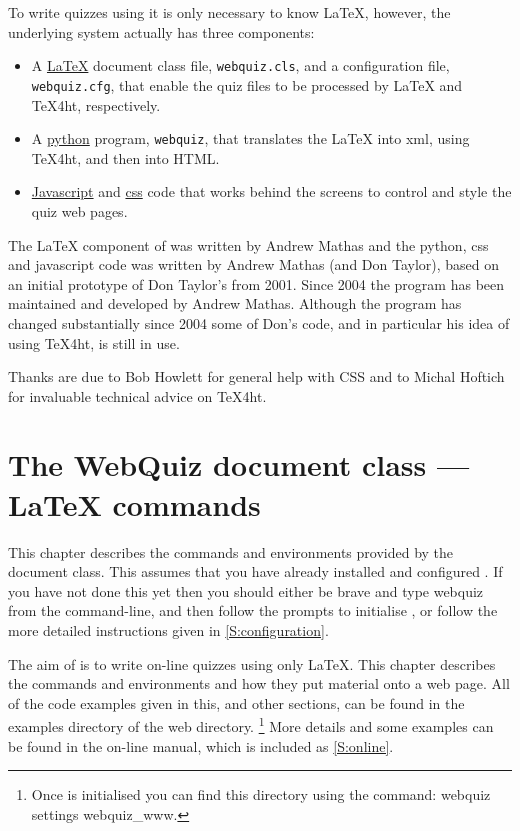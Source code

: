 \documentclass[svgnames]{article}
\newcommand\ddash{\texttt{\textemdash\textemdash}}
\newcommand\webquizopt[1]{\textsf{webquiz \ddash#1}}
\begin{document}
    To write quizzes using \WebQuiz it is only necessary to know
    \LaTeX, however, the underlying \WebQuiz system actually has three components:
    \begin{itemize}
      \item A \href{https://www.latex-project.org/}{\LaTeX} document class file, \texttt{webquiz.cls}, and
      a  configuration file, \texttt{webquiz.cfg}, that enable the
      quiz files to be processed by \LaTeX{} and \TeX 4ht, respectively.
      \item A \href{https://www.python.org/}{python} program, \texttt{webquiz}, that translates the
      \LaTeX{} into xml, using \TeX 4ht, and then into HTML.
      \item \href{https://www.w3schools.com/Js/}{Javascript} and \href{https://www.w3schools.com/css/}{css}
      code that works behind the screens to control and style the quiz web pages.
    \end{itemize}

   The \LaTeX{} component of \WebQuiz{} was written by Andrew Mathas
   and the python, css and javascript code was written by Andrew Mathas
   (and Don Taylor), based on an initial prototype of Don Taylor's from
   2001.  Since 2004 the program has been maintained and developed by
   Andrew Mathas. Although the program has changed substantially since
   2004 some of Don's code, and in particular his idea of using
   \TeX4ht, is still in use.

   Thanks are due to Bob Howlett for general help with CSS and to
   Michal Hoftich for invaluable technical advice on \TeX4ht.

 \section{The WebQuiz document class --- \LaTeX{} commands}\label{S:documentclass}

  This chapter describes the commands and environments provided by the
  \WebQuiz document class. This assumes that you have already installed
  and configured \WebQuiz. If you have not done this yet then you
  should either be brave and type \textsf{webquiz} from the
  command-line, and then follow the prompts to initialise \WebQuiz, or
  follow the more detailed instructions given in
  \autoref{S:configuration}.

  The aim of \WebQuiz is to write on-line quizzes using only \LaTeX.
  This chapter describes the \WebQuiz commands and environments and how
  they put material onto a web page.  All of the code examples given in
  this, and other sections, can be found in the \textsf{examples}
  directory of the \WebQuiz web directory.%
  \footnote{Once \WebQuiz is initialised you can find this directory
  using the command: \webquizopt{settings webquiz\_www}.}
  More details and some examples can be found in the on-line manual,
  which is included as \autoref{S:online}.
\end{document}
